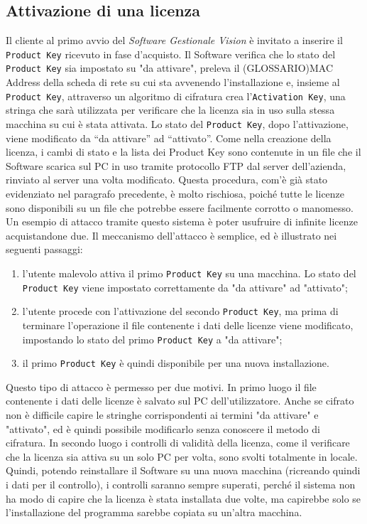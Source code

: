 \subsection{Attivazione di una licenza} 
Il cliente al primo avvio del \textit{Software Gestionale Vision} è invitato a inserire il \texttt{Product Key} ricevuto in fase d'acquisto. Il Software verifica che lo stato del \texttt{Product Key} sia impostato su "da attivare", preleva il (GLOSSARIO)MAC Address della scheda di rete su cui sta avvenendo l'installazione e, insieme al \texttt{Product Key}, attraverso un algoritmo di cifratura crea l’\texttt{Activation Key}, una stringa che sarà utilizzata per verificare che la licenza sia in uso sulla stessa macchina su cui è stata attivata. Lo stato del \texttt{Product Key}, dopo l'attivazione, viene modificato da “da attivare” ad “attivato”. Come nella creazione della licenza, i cambi di stato e la lista dei Product Key sono contenute in un file che il Software scarica sul PC in uso tramite protocollo FTP dal server dell’azienda, rinviato al server una volta modificato. Questa procedura, com'è già stato evidenziato nel paragrafo precedente, è molto rischiosa, poiché tutte le licenze sono disponibili su un file che potrebbe essere facilmente corrotto o manomesso.\\
Un esempio di attacco tramite questo sistema è poter usufruire di infinite licenze acquistandone due. 
Il meccanismo dell'attacco è semplice, ed è illustrato nei seguenti passaggi:
\begin{enumerate}
\item l'utente malevolo attiva il primo \texttt{Product Key} su una macchina. Lo stato del \texttt{Product Key} viene impostato correttamente da "da attivare" ad "attivato"; 
\item l'utente procede con l'attivazione del secondo \texttt{Product Key}, ma prima di terminare l'operazione il file contenente i dati delle licenze viene modificato, impostando lo stato del primo \texttt{Product Key} a "da attivare";
\item il primo \texttt{Product Key} è quindi disponibile per una nuova installazione.
\end{enumerate}
Questo tipo di attacco è permesso per due motivi. In primo luogo il file contenente i dati delle licenze è salvato sul PC dell'utilizzatore. Anche se cifrato non è difficile capire le stringhe corrispondenti ai termini "da attivare" e "attivato", ed è quindi possibile modificarlo senza conoscere il metodo di cifratura. In secondo luogo i controlli di validità della licenza, come il verificare che la licenza sia attiva su un solo PC per volta, sono svolti totalmente in locale. Quindi, potendo reinstallare il Software su una nuova macchina (ricreando quindi i dati per il controllo), i controlli saranno sempre superati, perché il sistema non ha modo di capire che la licenza è stata installata due volte, ma capirebbe solo se l'installazione del programma sarebbe copiata su un'altra macchina. 

